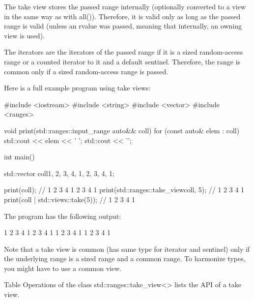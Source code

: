 The take view stores the passed range internally (optionally converted to a view in the same way as with all()). Therefore, it is valid only as long as the passed range is valid (unless an rvalue was passed, meaning that internally, an owning view is used).

The iterators are the iterators of the passed range if it is a sized random-access range or a counted iterator to it and a default sentinel. Therefore, the range is common only if a sized random-access range is passed.

Here is a full example program using take views:


\begin{cpp}
#include <iostream>
#include <string>
#include <vector>
#include <ranges>

void print(std::ranges::input_range auto&& coll)
{
	for (const auto& elem : coll) {
		std::cout << elem << ' ';
	}
	std::cout << '\n';
}

int main()
{
	std::vector coll{1, 2, 3, 4, 1, 2, 3, 4, 1};
	
	print(coll); // 1 2 3 4 1 2 3 4 1
	print(std::ranges::take_view{coll, 5}); // 1 2 3 4 1
	print(coll | std::views::take(5)); // 1 2 3 4 1
}
\end{cpp}

The program has the following output:

\begin{shell}
1 2 3 4 1 2 3 4 1
1 2 3 4 1
1 2 3 4 1
\end{shell}


Note that a take view is common (has same type for iterator and sentinel) only if the underlying range is a sized range and a common range. To harmonize types, you might have to use a common view.


Table Operations of the class std::ranges::take\_view<> lists the API of a take view.


